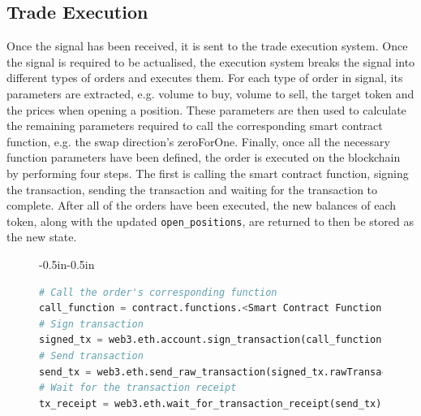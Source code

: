 \subsection{Trade Execution}
Once the signal has been received, it is sent to the trade execution system. Once the signal is required to be actualised, the execution system breaks the signal into different types of orders and executes them. For each type of order in signal, its parameters are extracted, e.g. volume to buy, volume to sell, the target token and the prices when opening a position. These parameters are then used to calculate the remaining parameters required to call the corresponding smart contract function, e.g. the swap direction's zeroForOne. Finally, once all the necessary function parameters have been defined, the order is executed on the blockchain by performing four steps. The first is calling the smart contract function, signing the transaction, sending the transaction and waiting for the transaction to complete. After all of the orders have been executed, the new balances of each token, along with the updated \texttt{open\_positions}, are returned to then be stored as the new state.
\begin{figure}[htb!]
\begin{adjustwidth}{-0.5in}{-0.5in}
\begin{minipage}{\linewidth}
\centering
\begin{lstlisting}[language=Python]
# Call the order's corresponding function
call_function = contract.functions.<Smart Contract Function Name>(<Function Paramters>).buildTransaction({"chainId": Chain_id, "from": caller, "nonce": nonce})
# Sign transaction
signed_tx = web3.eth.account.sign_transaction(call_function, private_key=private_key)
# Send transaction
send_tx = web3.eth.send_raw_transaction(signed_tx.rawTransaction)
# Wait for the transaction receipt
tx_receipt = web3.eth.wait_for_transaction_receipt(send_tx)
\end{lstlisting}
\end{minipage}
\end{adjustwidth}
\end{figure}
